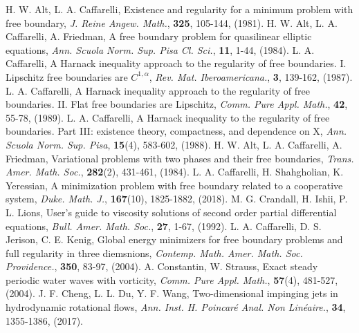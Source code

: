 \documentclass[11pt,reqno]{amsart}
\begin{document}
\begin{thebibliography}{60}
	 H. W. Alt, L. A. Caffarelli, \newblock Existence and regularity for a minimum problem with free boundary, {\it J. Reine Angew. Math.}, {\bf 325}, 105-144, (1981).
	H. W. Alt, L. A. Caffarelli, A. Friedman, \newblock A free boundary problem for quasilinear elliptic equations, {\it Ann. Scuola Norm. Sup. Pisa Cl. Sci.}, {\bf 11}, 1-44, (1984).
	 L. A. Caffarelli, \newblock A Harnack inequality approach to the regularity of free boundaries. I. Lipschitz free boundaries are $C^{1,\alpha}$, {\it Rev. Mat. Iberoamericana.}, {\bf 3}, 139-162, (1987).
	 L. A. Caffarelli, \newblock A Harnack inequality approach to the regularity of free boundaries. II. Flat free boundaries are Lipschitz, {\it  Comm. Pure Appl. Math.}, {\bf 42}, 55-78, (1989).
	 L. A. Caffarelli,  \newblock A Harnack inequality to the regularity of free boundaries. Part III: existence theory, compactness, and dependence on X, {\it Ann. Scuola Norm. Sup. Pisa}, {\bf 15}(4), 583-602, (1988).
	 H. W. Alt, L. A. Caffarelli, A. Friedman, \newblock Variational problems with two phases and their free boundaries, {\it Trans. Amer. Math. Soc.}, {\bf 282}(2), 431-461, (1984).
	 L. A. Caffarelli, H. Shahgholian, K. Yeressian, \newblock A minimization problem with free boundary related to a cooperative system, {\it Duke. Math. J.}, {\bf 167}(10), 1825-1882, (2018).
	 M. G. Crandall, H. Ishii, P. L. Lions, \newblock User's guide to viscosity solutions of second order partial differential equations, {\it Bull. Amer. Math. Soc.}, {\bf 27}, 1-67, (1992).
	 L. A. Caffarelli, D. S. Jerison, C. E. Kenig,   \newblock Global energy minimizers for free boundary problems and full regularity in three diemsnions, {\it Contemp. Math. Amer. Math. Soc. Providence.}, {\bf 350}, 83-97, (2004).
	 A. Constantin, W. Strauss, \newblock Exact steady periodic water waves with vorticity, {\it Comm. Pure Appl. Math.}, {\bf 57}(4), 481-527, (2004).
	 J. F. Cheng, L. L. Du, Y. F. Wang, \newblock Two-dimensional impinging jets in hydrodynamic rotational flows, {\em Ann. Inst. H. Poincar\'{e} Anal. Non Lin\'eaire.}, {\bf 34}, 1355-1386, (2017).

\end{thebibliography}
\end{document}
